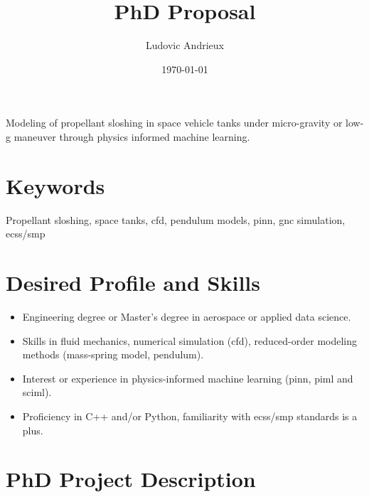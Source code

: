 \documentclass[12pt]{article}
\title{PhD Proposal}
\author{Ludovic Andrieux}
\date{\today}
\begin{document}
	\maketitle
	
	\begin{tcolorbox}[colback=gray!0, colframe=black, sharp corners, boxrule=0.5pt]
		Modeling of propellant sloshing in space vehicle tanks under micro-gravity or low-g maneuver through physics informed machine learning.
	\end{tcolorbox}
	
	\section*{Keywords}
	
	Propellant sloshing, space tanks, \acrshort{cfd}, pendulum models, \acrshort{pinn}, \acrshort{gnc} simulation, \acrshort{ecss}/\acrshort{smp}
	
	\section*{Desired Profile and Skills}
	
	\begin{itemize}
		\item Engineering degree or Master's degree in aerospace or applied data science.
		
		\item Skills in fluid mechanics, numerical simulation (\acrshort{cfd}), reduced-order modeling methods (mass-spring model, pendulum).
		
		\item Interest or experience in physics-informed machine learning (\acrshort{pinn}, \acrshort{piml} and \acrshort{sciml}).
		
		\item Proficiency in C++ and/or Python, familiarity with \acrshort{ecss}/\acrshort{smp} standards is a plus.
	\end{itemize}
	
	\section*{PhD Project Description}
	
\end{document}
